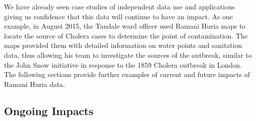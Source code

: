 \documentclass[a4paper,12pt,twoside]{article}
\begin{document}
We have already seen case studies of independent data use and applications giving us confidence that this data will continue to have an impact. As one example, in August 2015, the Tandale ward officer used Ramani Huria maps to locate the source of Cholera cases to determine the point of contamination. The maps provided them with detailed information on water points and sanitation data, thus allowing his team to investigate the sources of the outbreak, similar to the John Snow initiative in response to the 1859 Cholera outbreak in London. The following sections provide further examples of current and future impacts of Ramani Huria data. 

\subsection{Ongoing Impacts}
\end{document}
